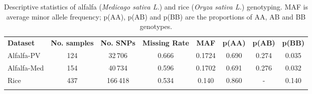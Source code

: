 \begin{table}
\centering
\caption[Descriptive statistics]{
Descriptive statistics of alfalfa (\emph{Medicago sativa L.}) 
and rice (\emph{Oryza sativa L.}) genotyping. MAF is average minor allele frequency; 
p(AA), p(AB) and p(BB) are the proportions of AA, AB and BB genotypes.}
\label{tab:descriptive_statistics}
\begin{tabular}{lccccccc}
\hline\noalign{\smallskip}
\noalign{\smallskip}\hline\noalign{\smallskip}
\textbf{Dataset} & \textbf{No. samples} & \textbf{No. SNPs} & \textbf{Missing Rate} & \textbf{MAF} & \textbf{p(AA)} & \textbf{p(AB)} & \textbf{p(BB)}\\
\noalign{\smallskip}\Xhline{3\arrayrulewidth}\noalign{\smallskip}
Alfalfa-PV & 124 & 32\,706 & 0.666 & 0.1724 & 0.690 & 0.274 & 0.035\\
Alfalfa-Med & 154 & 40\,734 & 0.596 & 0.1702 & 0.691 & 0.276 & 0.032\\
Rice & 437 & 166\,418 & 0.534 & 0.140 & 0.860 & - & 0.140 \\
\noalign{\smallskip}\hline
\end{tabular}
\end{table}
